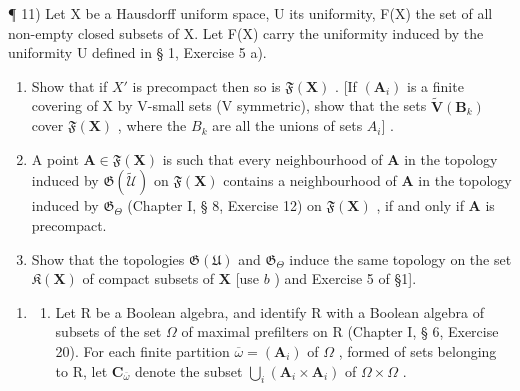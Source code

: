 ¶ 11) Let X be a Hausdorff uniform space, U its uniformity, F(X) the set of all non-empty closed subsets of X. Let F(X) carry the uniformity induced by the uniformity U defined in § 1, Exercise 5 a).

\begin{enumerate}
\def\labelenumi{\alph{enumi})}
\item
  Show that if \(X'\) is precompact then so is \(\mathfrak{F}(\mathbf{X})\) . {[}If \((\mathbf{A}_{i})\) is a finite covering of X by V-small sets (V symmetric), show that the sets \(\tilde{\mathbf{V}}(\mathbf{B}_{k})\) cover \(\mathfrak{F}(\mathbf{X})\) , where the \(B_{k}\) are all the unions of sets \(A_{i}]\) .
\item
  A point \(\mathbf{A} \in \mathfrak{F}(\mathbf{X})\) is such that every neighbourhood of \(\mathbf{A}\) in the topology induced by \(\mathfrak{G}(\tilde{\mathcal{U}})\) on \(\mathfrak{F}(\mathbf{X})\) contains a neighbourhood of \(\mathbf{A}\) in the topology induced by \(\mathfrak{G}_{\Theta}\) (Chapter I, § 8, Exercise 12) on \(\mathfrak{F}(\mathbf{X})\) , if and only if \(\mathbf{A}\) is precompact.
\item
  Show that the topologies \(\mathfrak{G}(\mathfrak{U})\) and \(\mathfrak{G}_{\Theta}\) induce the same topology on the set \(\mathfrak{K}(\mathbf{X})\) of compact subsets of \(\mathbf{X}\) {[}use \(b\) ) and Exercise 5 of §1{]}.
\end{enumerate}

\begin{enumerate}
\def\labelenumi{\arabic{enumi})}
\setcounter{enumi}{11}
\tightlist
\item
  \begin{enumerate}
  \def\labelenumii{\alph{enumii})}
  \tightlist
  \item
    Let R be a Boolean algebra, and identify R with a Boolean algebra of subsets of the set \(\Omega\) of maximal prefilters on R (Chapter I, § 6, Exercise 20). For each finite partition \(\overline{\omega} = (\mathbf{A}_i)\) of \(\Omega\) , formed of sets belonging to R, let \(\mathbf{C}_{\overline{\omega}}\) denote the subset \(\bigcup_{i} (\mathbf{A}_i \times \mathbf{A}_i)\) of \(\Omega \times \Omega\) .
  \end{enumerate}
\end{enumerate}

